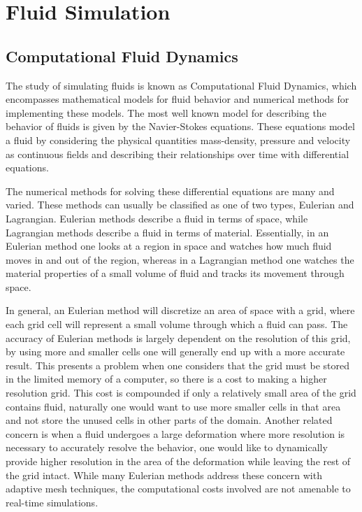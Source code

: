 \chapter{Fluid Simulation}

\section{Computational Fluid Dynamics}

The study of simulating fluids is known as Computational Fluid Dynamics, which
encompasses mathematical models for fluid behavior and numerical methods for
implementing these models. The most well known model for describing the
behavior of fluids is given by the Navier-Stokes equations. These equations
model a fluid by considering the physical quantities mass-density, pressure and
velocity as continuous fields and describing their relationships over time with
differential equations.


The numerical methods for solving these differential equations are many and
varied. These methods can usually be classified as one of two types, Eulerian
and Lagrangian. Eulerian methods describe a fluid in terms of space, while
Lagrangian methods describe a fluid in terms of material. Essentially, in an
Eulerian method one looks at a region in space and watches how much fluid moves
in and out of the region, whereas in a Lagrangian method one watches the
material properties of a small volume of fluid and tracks its movement through
space.


In general, an Eulerian method will discretize an area of space with a grid,
where each grid cell will represent a small volume through which a fluid can
pass. The accuracy of Eulerian methods is largely dependent on the resolution
of this grid, by using more and smaller cells one will generally end up with a
more accurate result. This presents a problem when one considers that the grid
must be stored in the limited memory of a computer, so there is a cost to
making a higher resolution grid. This cost is compounded if only a relatively
small area of the grid contains fluid, naturally one would want to use more
smaller cells in that area and not store the unused cells in other parts of the
domain. Another related concern is when a fluid undergoes a large deformation
where more resolution is necessary to accurately resolve the behavior, one
would like to dynamically provide higher resolution in the area of the
deformation while leaving the rest of the grid intact.
While many Eulerian methods address these concern with adaptive mesh techniques,
the computational costs involved are not amenable to real-time simulations. 


